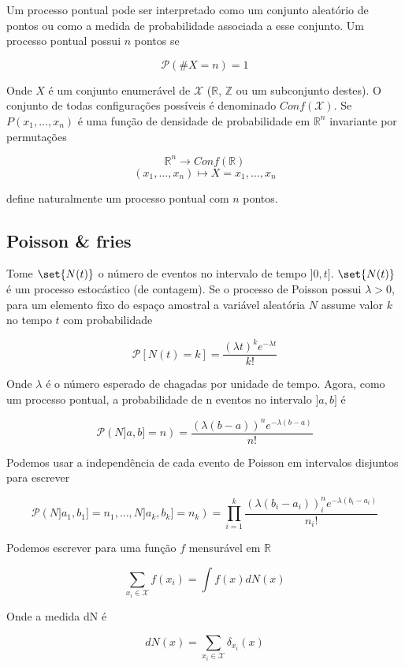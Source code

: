 Um processo pontual pode ser interpretado como um conjunto aleatório de pontos ou como a medida de probabilidade associada a esse conjunto. Um processo pontual possui $n$ pontos se

\[
\mathcal{P}(\# X=n) = 1
\]

Onde $X$ é um conjunto enumerável de $\mathcal{X}$ ($\mathbb{R}$, $\mathbb{Z}$ ou um subconjunto destes). O conjunto de todas configurações possíveis é denominado $Conf(\mathcal{X})$. Se $P(x_1, \dots, x_n)$ é uma função de densidade de probabilidade em $\mathbb{R}^n$ invariante por permutações

\[
	\mathbb{R}^n \rightarrow Conf(\mathbb{R})
\]
\[
	(x_1, \dots, x_n) \mapsto X = {x_1, \dots, x_n}
\]

define naturalmente um processo pontual com $n$ pontos.

\subsection{Poisson \& fries}

Tome $\set{N(t)}$ o número de eventos no intervalo de tempo $]0,t]$. $\set{N(t)}$  é um processo estocástico (de contagem). Se o processo de Poisson possui $\lambda > 0$, para um elemento fixo do espaço amostral a variável aleatória $N$ assume valor $k$ no tempo $t$ com probabilidade

\begin{equation}
	\mathcal{P}[N(t) = k] = \frac{(\lambda t)^k e^{-\lambda t}}{k!}
\end{equation}

Onde $\lambda$ é o número esperado de chagadas por unidade de tempo. Agora, como um processo pontual, a probabilidade de n eventos no intervalo $]a,b]$ é

\[
	\mathcal{P}(N]a,b] = n) =  \frac{(\lambda (b-a))^n e^{-\lambda (b-a)}}{n!}
\]

Podemos usar a independência de cada evento de Poisson em intervalos disjuntos para escrever

\[
	\mathcal{P}(N]a_1,b_1] = n_1, \dots, N]a_k,b_k] = n_k) = \prod_{i=1}^{k} \frac{(\lambda (b_i-a_i))^n_i e^{-\lambda (b_i-a_i)}}{n_i!}
\]

Podemos escrever para uma função $f$ mensurável em $\mathbb{R}$

\[
	\sum_{x_i \in \mathcal{X}} f(x_i) = \int f(x) dN(x)
\]

Onde a medida dN é

\[
	dN(x) = \sum_{x_i \in \mathcal{X}} \delta_{x_i} (x)
\]

